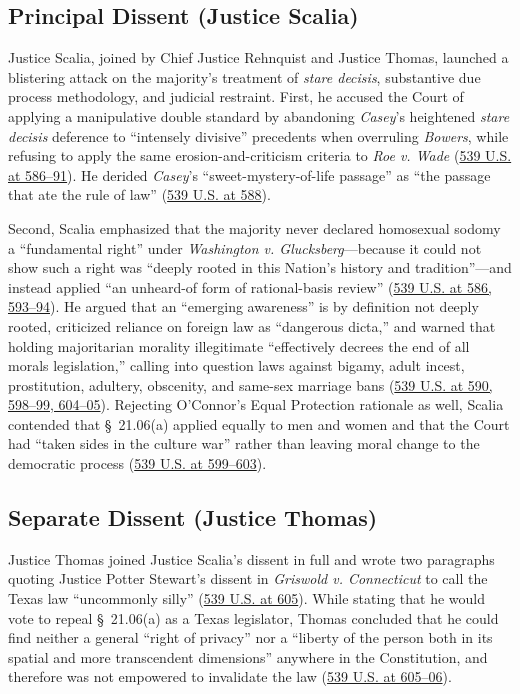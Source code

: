 \documentclass[12pt]{article}
\begin{document}
\subsection{Principal Dissent (Justice Scalia)}
Justice Scalia, joined by Chief Justice Rehnquist and Justice Thomas, launched a blistering attack on the majority's treatment of \textit{stare decisis}, substantive due process methodology, and judicial restraint. First, he accused the Court of applying a manipulative double standard by abandoning \textit{Casey}'s heightened \textit{stare decisis} deference to ``intensely divisive'' precedents when overruling \textit{Bowers}, while refusing to apply the same erosion-and-criticism criteria to \textit{Roe v. Wade} (\href{https://www.law.cornell.edu/supremecourt/text/02-102}{539 U.S. at 586--91}). He derided \textit{Casey}'s ``sweet-mystery-of-life passage'' as ``the passage that ate the rule of law'' (\href{https://www.law.cornell.edu/supremecourt/text/02-102}{539 U.S. at 588}).

Second, Scalia emphasized that the majority never declared homosexual sodomy a ``fundamental right'' under \textit{Washington v. Glucksberg}---because it could not show such a right was ``deeply rooted in this Nation's history and tradition''---and instead applied ``an unheard-of form of rational-basis review'' (\href{https://www.law.cornell.edu/supremecourt/text/02-102}{539 U.S. at 586, 593--94}). He argued that an ``emerging awareness'' is by definition not deeply rooted, criticized reliance on foreign law as ``dangerous dicta,'' and warned that holding majoritarian morality illegitimate ``effectively decrees the end of all morals legislation,'' calling into question laws against bigamy, adult incest, prostitution, adultery, obscenity, and same-sex marriage bans (\href{https://www.law.cornell.edu/supremecourt/text/02-102}{539 U.S. at 590, 598--99, 604--05}). Rejecting O'Connor's Equal Protection rationale as well, Scalia contended that \S~21.06(a) applied equally to men and women and that the Court had ``taken sides in the culture war'' rather than leaving moral change to the democratic process (\href{https://www.law.cornell.edu/supremecourt/text/02-102}{539 U.S. at 599--603}).

\subsection{Separate Dissent (Justice Thomas)}
Justice Thomas joined Justice Scalia's dissent in full and wrote two paragraphs quoting Justice Potter Stewart's dissent in \textit{Griswold v. Connecticut} to call the Texas law ``uncommonly silly'' (\href{https://www.law.cornell.edu/supremecourt/text/02-102}{539 U.S. at 605}). While stating that he would vote to repeal \S~21.06(a) as a Texas legislator, Thomas concluded that he could find neither a general ``right of privacy'' nor a ``liberty of the person both in its spatial and more transcendent dimensions'' anywhere in the Constitution, and therefore was not empowered to invalidate the law (\href{https://www.law.cornell.edu/supremecourt/text/02-102}{539 U.S. at 605--06}).
\end{document}
